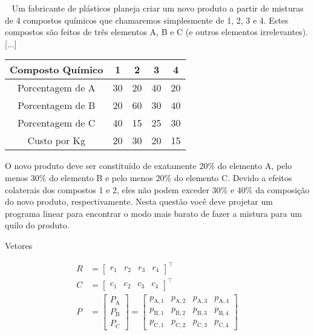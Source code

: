 ~
Um fabricante de plásticos planeja criar um novo produto a partir de misturas de 4 compostos químicos que chamaremos simplesmente de 1, 2, 3 e 4. Estes compostos são feitos de três elementos A, B e C (e outros elementos irrelevantes). [...]

\begin{table}[H]
    \centering
    \begin{tabular}{ccccc}
        \toprule
        Composto Químico & 1 & 2 & 3 & 4 \\
        \midrule
        Porcentagem de A & 30 & 20 & 40 & 20 \\
        Porcentagem de B & 20 & 60 & 30 & 40 \\
        Porcentagem de C & 40 & 15 & 25 & 30 \\
        \midrule
        Custo por Kg & 20 & 30 & 20 & 15 \\
        \bottomrule
    \end{tabular}
\end{table}

O novo produto deve ser constituído de exatamente 20\% do elemento A, pelo menos 30\% do elemento B e pelo menos 20\% do elemento C. Devido a efeitos colaterais dos compostos 1 e 2, eles não podem exceder 30\% e 40\% da composição do novo produto, respectivamente. Nesta questão você deve projetar um programa linear para encontrar o modo mais barato de fazer a mistura para um quilo do produto.

\itemdsep
\def\eA{{\text{A}}}
\def\eB{{\text{B}}}
\def\eC{{\text{C}}}
\def\eX{{\text{X}}}

Vetores

\begin{align*}
    R &= \begin{bmatrix} r_1 & r_2 & r_3 & r_4 \end{bmatrix}^\intercal \\
    C &= \begin{bmatrix} c_1 & c_2 & c_3 & c_4 \end{bmatrix}^\intercal \\
    P &= \begin{bmatrix}
        P_\eA \\
        P_\eB \\
        P_\eC
    \end{bmatrix}
    =
    \begin{bmatrix}
        p_{\eA,1} & p_{\eA,2} & p_{\eA,3} & p_{\eA,4} \\
        p_{\eB,1} & p_{\eB,2} & p_{\eB,3} & p_{\eB,4} \\
        p_{\eC,1} & p_{\eC,2} & p_{\eC,3} & p_{\eC,4}
    \end{bmatrix}
\end{align*}


